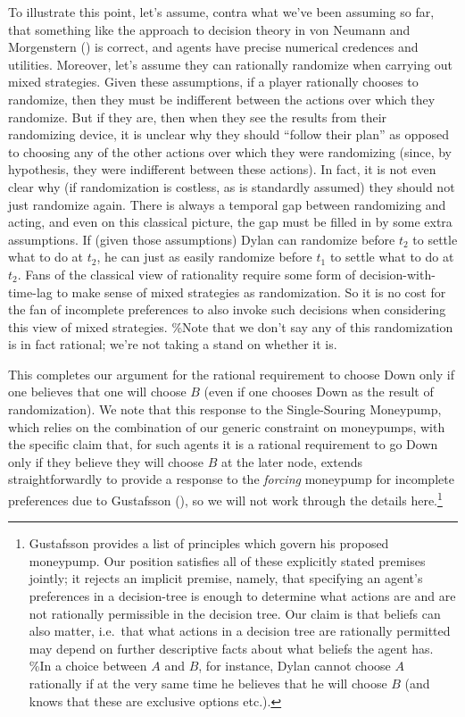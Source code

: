 \documentclass[
  11pt,
  letterpaper,
  DIV=11,
  numbers=noendperiod,
  twoside]{scrartcl}
\begin{document}
To illustrate this point, let's assume, contra what we've been assuming
so far, that something like the approach to decision theory in von
Neumann and Morgenstern () is correct, and
agents have precise numerical credences and utilities. Moreover, let's
assume they can rationally randomize when carrying out mixed strategies.
Given these assumptions, if a player rationally chooses to randomize,
then they must be indifferent between the actions over which they
randomize. But if they are, then when they see the results from their
randomizing device, it is unclear why they should ``follow their plan''
as opposed to choosing any of the other actions over which they were
randomizing (since, by hypothesis, they were indifferent between these
actions). In fact, it is not even clear why (if randomization is
costless, as is standardly assumed) they should not just randomize
again. There is always a temporal gap between randomizing and acting,
and even on this classical picture, the gap must be filled in by some
extra assumptions. If (given those assumptions) Dylan can randomize
before \(t_2\) to settle what to do at \(t_2\), he can just as easily
randomize before \(t_1\) to settle what to do at \(t_2\). Fans of the
classical view of rationality require some form of
decision-with-time-lag to make sense of mixed strategies as
randomization. So it is no cost for the fan of incomplete preferences to
also invoke such decisions when considering this view of mixed
strategies. \%Note that we don't say any of this randomization is in
fact rational; we're not taking a stand on whether it is.

This completes our argument for the rational requirement to choose Down
only if one believes that one will choose \(B\) (even if one chooses
Down as the result of randomization). We note that this response to the
Single-Souring Moneypump, which relies on the combination of our generic
constraint on moneypumps, with the specific claim that, for such agents
it is a rational requirement to go Down only if they believe they will
choose \(B\) at the later node, extends straightforwardly to provide a
response to the \emph{forcing} moneypump for incomplete preferences due
to Gustafsson (), so we will
not work through the details here.\footnote{Gustafsson provides a list
  of principles which govern his proposed moneypump. Our position
  satisfies all of these explicitly stated premises jointly; it rejects
  an implicit premise, namely, that specifying an agent's preferences in
  a decision-tree is enough to determine what actions are and are not
  rationally permissible in the decision tree. Our claim is that beliefs
  can also matter, i.e.~that what actions in a decision tree are
  rationally permitted may depend on further descriptive facts about
  what beliefs the agent has. \%In a choice between \(A\) and \(B\), for
  instance, Dylan cannot choose \(A\) rationally if at the very same
  time he believes that he will choose \(B\) (and knows that these are
  exclusive options etc.).}
\end{document}
